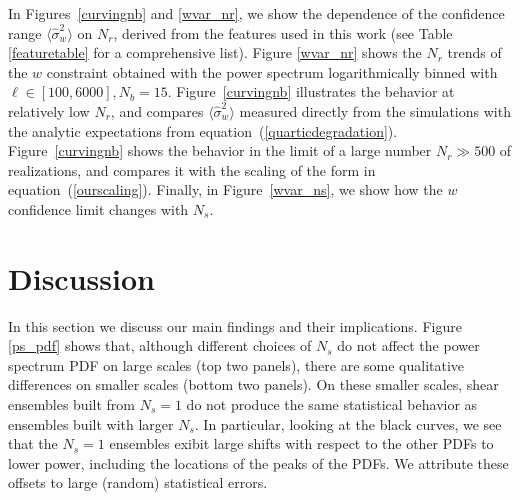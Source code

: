\documentclass[reprint,aps,prd,superscriptaddress,showkeys,showpacs]{revtex4-1}
\newcommand{\h}[1]{\hat{#1}}
\begin{document}
In Figures~\ref{curvingnb} and \ref{wvar_nr}, we show the dependence
of the confidence range $\langle\h{\sigma}^2_w\rangle$ on $N_r$,
derived from the features used in this work (see Table \ref{featuretable} for a comprehensive list). Figure \ref{wvar_nr} shows the $N_r$ trends of the $w$ constraint obtained with the power spectrum logarithmically binned with $\ell\in[100,6000],N_b=15$. 
Figure~\ref{curvingnb} illustrates the behavior at relatively low
$N_r$, and compares $\langle\h{\sigma}^2_w\rangle$ measured directly
from the simulations with the analytic expectations from
equation~(\ref{quarticdegradation}).  Figure~\ref{curvingnb} shows the
behavior in the limit of a large number $N_r\gg500$ of realizations,
and compares it with the scaling of the form in
equation~(\ref{ourscaling}). Finally, in Figure~\ref{wvar_ns}, we show
how the $w$ confidence limit changes with $N_s$.


\section{Discussion}

In this section we discuss our main findings and their
implications. Figure \ref{ps_pdf} shows that, although different
choices of $N_s$ do not affect the power spectrum PDF on large scales
(top two panels), there are some qualitative differences on smaller
scales (bottom two panels). On these smaller scales, shear ensembles
built from $N_s=1$ do not produce the same statistical behavior as
ensembles built with larger $N_s$. In particular, looking at the
black curves, we see that the $N_s=1$ ensembles exibit large shifts
with respect to the other PDFs to lower power, including the locations
of the peaks of the PDFs.  We attribute these offsets to large
(random) statistical errors.
\end{document}
